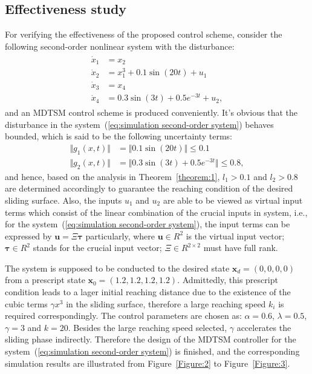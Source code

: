 \documentclass[3p]{elsarticle}
\theoremstyle{plain}
\theoremstyle{remark}
\begin{document}
\subsection{Effectiveness study}
For verifying the effectiveness of the proposed control scheme, consider the following second-order nonlinear system with the disturbance:
\begin{align}
\begin{split}
\dot x_1 &= x_2\\
\dot x_2 &= x_1^3+0.1\sin(20t)+u_1\\
\dot x_3 &= x_4\\
\dot x_4 &= 0.3\sin(3t)+0.5e^{-3t}+u_2,\label{eq:simulation second-order system}
\end{split}
\end{align}
and an MDTSM control scheme is produced conveniently. It's obvious that the disturbance in the system~(\ref{eq:simulation second-order system}) behaves bounded, which is said to be the following uncertainty terms:
\begin{align*}
\Vert g_1(x,t)\Vert &= \Vert 0.1\sin(20t)\Vert\le 0.1\\
\Vert g_2(x,t)\Vert &= \Vert 0.3\sin(3t)+0.5e^{-3t}\Vert\le 0.8,
\end{align*}
and hence, based on the analysis in Theorem~\ref{theorem:1}, $l_1>0.1$ and $l_2>0.8$ are determined accordingly to guarantee the reaching condition of the desired sliding surface. Also, the inputs $u_1$ and $u_2$ are able to be viewed as virtual input terms which consist of the linear combination of the crucial inputs in system, i.e., for the system~(\ref{eq:simulation second-order system}), the input terms can be expressed by $\bm u = \Xi\bm\tau$ particularly, where $\bm u\in R^2$ is the virtual input vector; $\bm \tau\in R^2$ stands for the crucial input vector; $\Xi\in R^{2\times 2}$ must have full rank.\par
The system is supposed to be conducted to the desired state $\bm x_d=(0,0,0,0)$ from a prescript state $\bm x_0=(1.2,1.2,1.2,1.2)$. Admittedly, this prescript condition leads to a lager initial reaching distance due to the existence of the cubic terms $\gamma x^3$ in the sliding surface, therefore a large reaching speed $k_i$ is required correspondingly. The control parameters are chosen as: $\alpha = 0.6$, $\lambda = 0.5$, $\gamma = 3$ and $k = 20$. Besides the large reaching speed selected, $\gamma$ accelerates the sliding phase indirectly. Therefore the design of the MDTSM controller for the system~(\ref{eq:simulation second-order system}) is finished, and the corresponding simulation results are illustrated from Figure~\ref{Figure:2} to Figure~\ref{Figure:3}.\par
\end{document}
